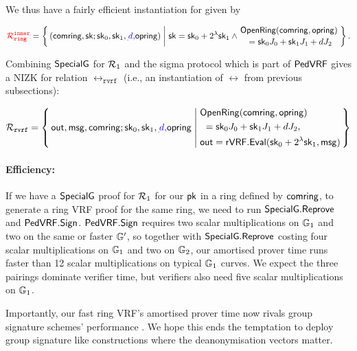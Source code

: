 We thus have a fairly efficient instantiation for {\color{red} \relone} given by

$$ {\color{red} \Rring^{\inner}} = \Setst{ (\comring, \sk ; \sk_0, \sk_1,\handan{}{d, }\openring) }{
  \sk = \sk_0+ 2^{\lambda} \sk_1 \wedge
 \genfrac{}{}{0pt}{}{ \eprint{\rVRF.}{}\OpenRing(\comring,\openring) }{ \,\, = \sk_0 \genJ_0 + \sk_1 \genJ_1 + d \genJ_2 }
} \mathperiod $$

Combining ${\mathsf{SpecialG}}$ for $\mathcal{R}_1$ and the sigma protocol which is part of ${\mathsf{PedVRF}}$ gives a 
NIZK for relation $\rel_{\mathtt{rvrf}}$ {\color{red} (i.e., an instantiation of $\rel$ from previous subsections)}:

$$ \rel_{\mathtt{rvrf}} = \Setst{ \Out, \msg, \comring ; \sk_0,\sk_1,\handan{}{d, }\openring }{
    \eprint{
        \eprint{\rVRF.}{}\OpenRing(\comring,\openring)    \textrm{ and }
        \,\, = \sk_0 \genJ_0 + \sk_1 \genJ_1 + d \genJ_2, \quad
        \Out = \rVRF.\Eval(\sk_0+ 2^{\lambda} \sk_1,\msg)
    }{
        \begin{aligned}
        & \eprint{\rVRF.}{}\OpenRing(\comring,\openring) \\
        & \,\, = \sk_0 \genJ_0 + \sk_1 \genJ_1 + d \genJ_2,\\
        & \Out = \rVRF.\Eval(\sk_0+ 2^{\lambda} \sk_1,\msg)
        \end{aligned}
    }
} $$

\paragraph{Efficiency:} If we have a ${\mathsf{SpecialG}}$ proof for $\mathcal{R}_1$ for our $\mathsf{pk}$ in a ring defined by $\mathsf{comring}$, 
to generate a ring VRF proof for the same ring, we need to run ${\mathsf{SpecialG}}.{\mathsf{Reprove}}$ and ${\mathsf{PedVRF}}.{\mathsf{Sign}}$. ${\mathsf{PedVRF}}.{\mathsf{Sign}}$ 
requires two scalar multiplications on ${\mathbb{G}}_1$
and two on the same or faster ${\mathbb{G}}'$,
so together with ${\mathsf{SpecialG}}.{\mathsf{Reprove}}$ costing four scalar multiplications
on ${\mathbb{G}}_1$ and two on ${\mathbb{G}}_2$, our amortised prover time
runs faster than 12 scalar multiplications on typical ${\mathbb{G}}_1$ curves. 
We expect the three pairings dominate verifier time, but
verifiers also need five scalar multiplications on ${\mathbb{G}}_1$.

Importantly, our fast ring VRF's amortised prover time now rivals
group signature schemes' performance \cite{group_sig_survey}.
We hope this ends the temptation to deploy group signature like
 constructions where the deanonymisation vectors matter. 



